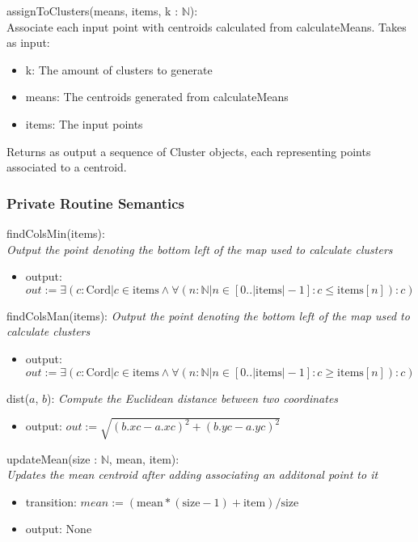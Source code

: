 \documentclass[12pt]{article}
\begin{document}
\noindent
assignToClusters(means, items, k : $\mathbb{N}$):\\
Associate each input point with centroids calculated from calculateMeans.
Takes as input:
\begin{itemize}
\item k: The amount of clusters to generate
\item means: The centroids generated from calculateMeans
\item items: The input points
\end{itemize}
Returns as output a sequence of Cluster objects, each representing
points associated to a centroid.

\subsubsection* {Private Routine Semantics}
findColsMin(items):\\
\textit{Output the point denoting the bottom left of the map used to calculate clusters}
\begin{itemize}
\item output: $out := \exists (c : \mbox{Cord} | c \in \mbox{items} \land
                      \forall (n : \mathbb{N} | n \in [0..|\mbox{items}|-1] :
                      c \leq \mbox{items}[n]) : c)$
\end{itemize}

\noindent
findColsMan(items):
\textit{Output the point denoting the bottom left of the map used to calculate clusters}
\begin{itemize}
\item output: $out := \exists (c : \mbox{Cord} | c \in \mbox{items} \land
                      \forall (n : \mathbb{N} | n \in [0..|\mbox{items}|-1] : 
                      c \geq \mbox{items}[n]) : c)$
\end{itemize}

\noindent
dist($a$, $b$):
\textit{Compute the Euclidean distance between two coordinates}
\begin{itemize}
\item output: $out := \sqrt{(b.xc-a.xc)^{2} + (b.yc-a.yc)^{2}}$
\end{itemize}

\noindent
updateMean(size : $\mathbb{N}$, mean, item):\\
\textit{Updates the mean centroid after adding associating an additonal point to it}
\begin{itemize}
\item transition: $mean := (\mbox{mean}*(\mbox{size}-1) + \mbox{item})/\mbox{size}$
\item output: None
\end{itemize}
\end{document}
